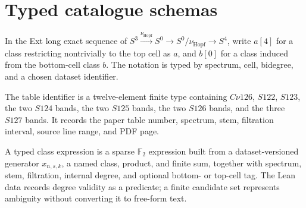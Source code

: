 \section{Typed catalogue schemas}

\begin{definition}
  \label{def:hopf-cofiber-cell-notation}
  \notready
  In the Ext long exact sequence of
  $S^3\xrightarrow{\nu_{\mathrm{Hopf}}}S^0\to S^0/\nu_{\mathrm{Hopf}}\to S^4$, write
  $a[4]$ for a class restricting nontrivially to the top cell as $a$, and
  $b[0]$ for a class induced from the bottom-cell class $b$.  The notation is
  typed by spectrum, cell, bidegree, and a chosen dataset identifier.
\end{definition}

\begin{definition}
  \label{def:appendix-table-id}
  \leanok
  The table identifier is a twelve-element finite type containing
  $C\nu126$, $S122$, $S123$, the two $S124$ bands, the two $S125$ bands, the
  two $S126$ bands, and the three $S127$ bands.  It records the paper table
  number, spectrum, stem, filtration interval, source line range, and PDF page.
\end{definition}

\begin{definition}
  \label{def:typed-class-expression}
  \leanok
  A typed class expression is a sparse $\mathbb F_2$ expression built from a
  dataset-versioned generator $x_{n,s,k}$, a named class, product, and finite
  sum, together with spectrum, stem, filtration, internal degree, and optional
  bottom- or top-cell tag.  The Lean data records degree validity as a
  predicate; a finite candidate set represents ambiguity without converting it
  to free-form text.
\end{definition}

